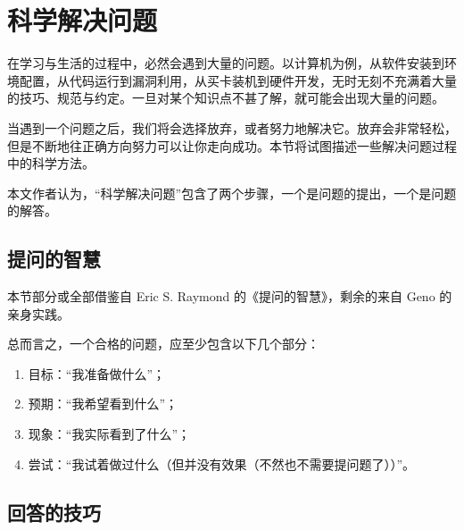 \section{科学解决问题}\label{sec:solving}
    在学习与生活的过程中，必然会遇到大量的问题。以计算机为例，从软件安装到环境配置，从代码运行到漏洞利用，从买卡装机到硬件开发，无时无刻不充满着大量的技巧、规范与约定。一旦对某个知识点不甚了解，就可能会出现大量的问题。

    当遇到一个问题之后，我们将会选择放弃，或者努力地解决它。放弃会非常轻松，但是不断地往正确方向努力可以让你走向成功。本节将试图描述一些解决问题过程中的科学方法。

    本文作者认为，“科学解决问题”包含了两个步骤，一个是问题的提出，一个是问题的解答。

    \subsection{提问的智慧}\label{subsec:solving/asking}
        本节部分或全部借鉴自 Eric S. Raymond 的《提问的智慧》\cite{esr}，剩余的来自 Geno 的亲身实践。

        总而言之，一个合格的问题，应至少包含以下几个部分：
        \begin{enumerate}
            \item 目标：“我准备做什么”；
            \item 预期：“我希望看到什么”；
            \item 现象：“我实际看到了什么”；
            \item 尝试：“我试着做过什么（但并没有效果（不然也不需要提问题了））”。
        \end{enumerate}

    \subsection{回答的技巧}\label{subsec:solving/answering}
